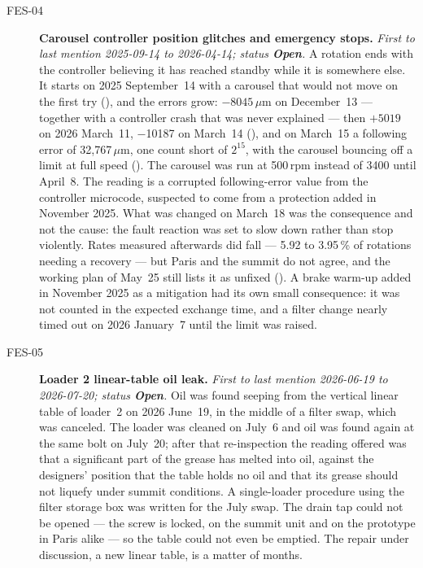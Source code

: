 \begin{description}
\item[FES-04]\label{iss:FES-04} \textbf{Carousel controller position glitches and emergency stops.}
  \emph{First to last mention 2025-09-14 to 2026-04-14; status \textcolor{stopn}{\textbf{Open}}.}
  A rotation ends with the controller believing it has reached standby while it is somewhere else.  It starts on 2025 September~14 with a carousel that would not move on the first try (), and the errors grow: $-8045\,\mu$m on December~13 --- together with a controller crash that was never explained --- then $+5019$ on 2026 March~11, $-$10187 on March~14 (), and on March~15 a following error of 32{,}767\,$\mu$m, one count short of $2^{15}$, with the carousel bouncing off a limit at full speed ().  The carousel was run at 500\,rpm instead of 3400 until April~8.  The reading is a corrupted following-error value from the controller microcode, suspected to come from a protection added in November 2025.  What was changed on March~18 was the consequence and not the cause: the fault reaction was set to slow down rather than stop violently.  Rates measured afterwards did fall --- 5.92 to 3.95\,\% of rotations needing a recovery --- but Paris and the summit do not agree, and the working plan of May~25 still lists it as unfixed ().  A brake warm-up added in November 2025 as a mitigation had its own small consequence: it was not counted in the expected exchange time, and a filter change nearly timed out on 2026 January~7 until the limit was raised.

\item[FES-05]\label{iss:FES-05} \textbf{Loader 2 linear-table oil leak.}
  \emph{First to last mention 2026-06-19 to 2026-07-20; status \textcolor{stopn}{\textbf{Open}}.}
  Oil was found seeping from the vertical linear table of loader~2 on 2026 June~19, in the middle of a filter swap, which was canceled.  The loader was cleaned on July~6 and oil was found again at the same bolt on July~20; after that re-inspection the reading offered was that a significant part of the grease has melted into oil, against the designers' position that the table holds no oil and that its grease should not liquefy under summit conditions.  A single-loader procedure using the filter storage box was written for the July swap.  The drain tap could not be opened --- the screw is locked, on the summit unit and on the prototype in Paris alike --- so the table could not even be emptied.  The repair under discussion, a new linear table, is a matter of months.


\end{description}
